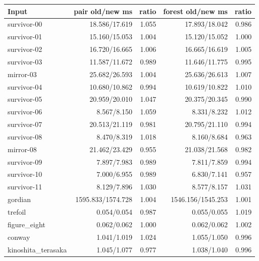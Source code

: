 \begin{center}\small
\begin{tabular}{@{}lrrrr@{}}
\toprule
Input & pair old/new ms & ratio & forest old/new ms & ratio \\
\midrule
survivor-00 & 18.586/17.619 & 1.055 & 17.893/18.042 & 0.986 \\
survivor-01 & 15.160/15.053 & 1.004 & 15.120/15.052 & 1.000 \\
survivor-02 & 16.720/16.665 & 1.006 & 16.665/16.619 & 1.005 \\
survivor-03 & 11.587/11.672 & 0.989 & 11.646/11.775 & 0.995 \\
mirror-03 & 25.682/26.593 & 1.004 & 25.636/26.613 & 1.007 \\
survivor-04 & 10.680/10.862 & 0.994 & 10.619/10.822 & 1.010 \\
survivor-05 & 20.959/20.010 & 1.047 & 20.375/20.345 & 0.990 \\
survivor-06 & 8.567/8.150 & 1.059 & 8.331/8.232 & 1.012 \\
survivor-07 & 20.513/21.119 & 0.981 & 20.795/21.110 & 0.994 \\
survivor-08 & 8.470/8.319 & 1.018 & 8.160/8.684 & 0.963 \\
mirror-08 & 21.462/23.429 & 0.955 & 21.038/21.568 & 0.982 \\
survivor-09 & 7.897/7.983 & 0.989 & 7.811/7.859 & 0.994 \\
survivor-10 & 7.000/6.955 & 0.989 & 6.830/7.141 & 0.957 \\
survivor-11 & 8.129/7.896 & 1.030 & 8.577/8.157 & 1.031 \\
gordian & 1595.833/1574.728 & 1.004 & 1546.156/1545.253 & 1.001 \\
trefoil & 0.054/0.054 & 0.987 & 0.055/0.055 & 1.019 \\
figure\_eight & 0.062/0.062 & 1.000 & 0.062/0.062 & 1.002 \\
conway & 1.041/1.019 & 1.024 & 1.055/1.050 & 0.996 \\
kinoshita\_terasaka & 1.045/1.077 & 0.977 & 1.038/1.040 & 0.996 \\
\bottomrule
\end{tabular}
\end{center}
